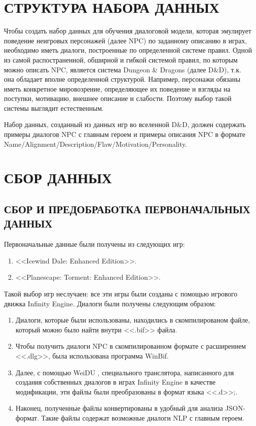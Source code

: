 \section{СТРУКТУРА НАБОРА ДАННЫХ}
Чтобы создать набор данных для обучения диалоговой модели, которая эмулирует поведение  неигровых персонажей (далее NPC) по заданному описанию в играх, необходимо иметь диалоги, построенные по определенной системе правил. Одной из самой распостраненной, обширной и гибкой системой правил, по которым можно описать NPC, является система Dungeon \& Dragons (далее D\&D), т.к. она обладает вполне определенной структурой. Например, персонажи обязаны иметь конкретное мировозрение, определяющее их поведение и взгляды на поступки, мотивацию, внешнее описание и слабости. Поэтому выбор такой системы выглядит естественным. 

Набор данных, созданный из данных игр во вселенной D\&D, должен содержать примеры диалогов NPC с главным героем и примеры описания NPC в формате Name/Alignment/Description/Flaw/Motivation/Personality.

\section{СБОР ДАННЫХ}
\subsection{СБОР И ПРЕДОБРАБОТКА ПЕРВОНАЧАЛЬНЫХ ДАННЫХ}
Первоначальные данные были получены из следующих игр: 
\begin{enumerate}
      \item <<Icewind Dale: Enhanced Edition>>.
      \item <<Planescape: Torment: Enhanced Edition>>.
\end{enumerate}

Такой выбор игр неслучаен: все эти игры были созданы с помощью  игрового движка Infinity Engine. Диалоги были получены следующим образом:
\begin{enumerate}
      \item Диалоги, которые были использованы, находились в скомпилированом файле, который можно было найти внутри <<.bif>> файла.
      \item Чтобы получить диалоги NPC в скомпилированном формате с расширением <<.dlg>>, была использована программа WinBif.
      \item Далее, с помощью WeiDU \cite{weidu-repo}, специального транслятора,
            написанного для создания собственных диалогов в играх Infinity Engine в качестве модификации, эти файлы были преобразованы в формат языка <<.d>>;.
      \item Наконец, полученные файлы конвертированы в удобный для анализа JSON-формат. Такие файлы содержат возможные диалоги NLP с главным героем.
\end{enumerate}

